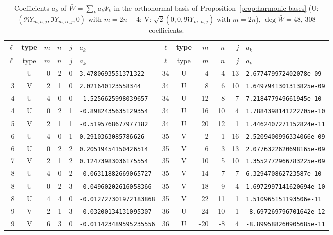 \begin{longtable}{rcrrrl|rcrrrl}
\caption{Coefficients $a_k$ of $\bar W=\sum_k a_k\Psi_k$ in the orthonormal basis of Proposition~\ref{prop:harmonic-bases} (U: $(\Re Y_{m,n,j},\Im Y_{m,n,j},0)$ with $m=2n-4$; V: $\sqrt2(0,0,\Re Y_{m,n,j})$ with $m=2n$), $\deg\bar W=48$, 308 coefficients.}\label{tab:coefficients}\\
\toprule
$\ell$ & type & $m$ & $n$ & $j$ & $a_k$ & $\ell$ & type & $m$ & $n$ & $j$ & $a_k$\\
\midrule
\endfirsthead
\toprule
$\ell$ & type & $m$ & $n$ & $j$ & $a_k$ & $\ell$ & type & $m$ & $n$ & $j$ & $a_k$\\
\midrule
\endhead
\bottomrule
\endfoot
2 & U & 0 & 2 & 0 & \texttt{3.4780693551371322} & 34 & U & 4 & 4 & 13 & \texttt{2.677479972402078e-09}\\
3 & V & 2 & 1 & 0 & \texttt{2.021640123558344} & 34 & U & 8 & 6 & 10 & \texttt{1.6497941301313825e-09}\\
4 & U & -4 & 0 & 0 & \texttt{-1.5256625998039657} & 34 & U & 12 & 8 & 7 & \texttt{7.218477949661945e-10}\\
4 & U & 0 & 2 & 1 & \texttt{-0.8982435635129354} & 34 & U & 16 & 10 & 4 & \texttt{1.7884398141222705e-10}\\
5 & V & 2 & 1 & 1 & \texttt{-0.5195768677977182} & 34 & U & 20 & 12 & 1 & \texttt{1.4462407271152824e-11}\\
6 & U & -4 & 0 & 1 & \texttt{0.2910363085786626} & 35 & V & 2 & 1 & 16 & \texttt{2.5209400996334066e-09}\\
6 & U & 0 & 2 & 2 & \texttt{0.20519454150426514} & 35 & V & 6 & 3 & 13 & \texttt{2.0776322620698165e-09}\\
7 & V & 2 & 1 & 2 & \texttt{0.12473983036175554} & 35 & V & 10 & 5 & 10 & \texttt{1.3552772966783225e-09}\\
8 & U & -4 & 0 & 2 & \texttt{-0.06311882669065727} & 35 & V & 14 & 7 & 7 & \texttt{6.329470862723587e-10}\\
8 & U & 0 & 2 & 3 & \texttt{-0.04960202616058366} & 35 & V & 18 & 9 & 4 & \texttt{1.6972997141620694e-10}\\
8 & U & 4 & 4 & 0 & \texttt{-0.012727301972183868} & 35 & V & 22 & 11 & 1 & \texttt{1.510965151193506e-11}\\
9 & V & 2 & 1 & 3 & \texttt{-0.03200134131095307} & 36 & U & -24 & -10 & 1 & \texttt{-8.697269796701642e-12}\\
9 & V & 6 & 3 & 0 & \texttt{-0.011423489595235556} & 36 & U & -20 & -8 & 4 & \texttt{-8.899588260905685e-11}\\

\end{longtable}
